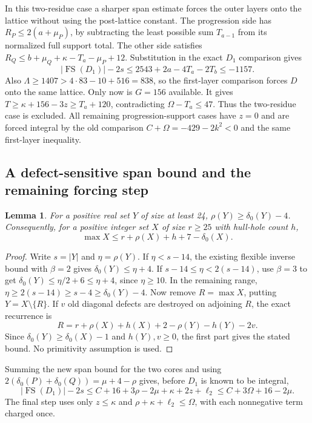 \documentclass[11pt,a4paper]{article}
\newtheorem{lemma}[theorem]{Lemma}
\theoremstyle{remark}
\newcommand{\FS}{\operatorname{FS}}
\begin{document}
In this two-residue case a sharper span estimate forces the outer layers
onto the lattice without using the post-lattice constant. The progression
side has $R_P\le2(a+\mu_P)$, by subtracting the least possible sum
$T_{a-1}$ from its normalized full support total. The other side satisfies
$R_Q\le b+\mu_Q+\kappa-T_a-\mu_P+12$.
Substitution in the exact $D_1$ comparison gives
\[
 |\FS(D_1)|-2s
 \le2543+2a-4T_a-2T_b\le-1157.
\]
Also $\Lambda\ge1407>4\cdot83-10+516=838$, so the first-layer
comparison forces $D$ onto the same lattice. Only now is $G=156$
available. It gives
$T\ge\kappa+156-3z\ge T_a+120$, contradicting
$\Omega-T_a\le47$. Thus the two-residue case is excluded.
All remaining progression-support cases have $z=0$ and are forced
integral by the old comparison $C+\Omega=-429-2k^2<0$ and the same
first-layer inequality.

\subsection{A defect-sensitive span bound and the remaining forcing step}
\begin{lemma}\label{u86:lem:defectspan}
For a positive real set $Y$ of size at least 24,
$\rho(Y)\ge\delta_0(Y)-4$. Consequently, for a positive integer set
$X$ of size $r\ge25$ with hull-hole count $h$,
\[
 \max X\le r+\rho(X)+h+7-\delta_0(X).
\]
\end{lemma}
\begin{proof}
Write $s=|Y|$ and $\eta=\rho(Y)$. If $\eta<s-14$, the existing
flexible inverse bound with $\beta=2$ gives $\delta_0(Y)\le\eta+4$.
If $s-14\le\eta<2(s-14)$, use $\beta=3$ to get
$\delta_0(Y)\le\eta/2+6\le\eta+4$, since $\eta\ge10$.
In the remaining range, $\eta\ge2(s-14)\ge s-4\ge\delta_0(Y)-4$.
Now remove $R=\max X$, putting $Y=X\setminus\{R\}$. If $v$ old
diagonal defects are destroyed on adjoining $R$, the exact recurrence is
\[
 R=r+\rho(X)+h(X)+2-\rho(Y)-h(Y)-2v.
\]
Since $\delta_0(Y)\ge\delta_0(X)-1$ and $h(Y),v\ge0$, the first
part gives the stated bound. No primitivity assumption is used.
\end{proof}

Summing the new span bound for the two cores and using
$2(\delta_0(P)+\delta_0(Q))=\mu+4-\rho$ gives, before $D_1$ is
known to be integral,
\begin{equation}\label{u86:eq:defectforce}
 |\FS(D_1)|-2s
 \le C+16+3\rho-2\mu+\kappa+2z+\ell_2
 \le C+3\Omega+16-2\mu.
\end{equation}
The final step uses only $z\le\kappa$ and
$\rho+\kappa+\ell_2\le\Omega$, with each nonnegative term charged once.
\end{document}
